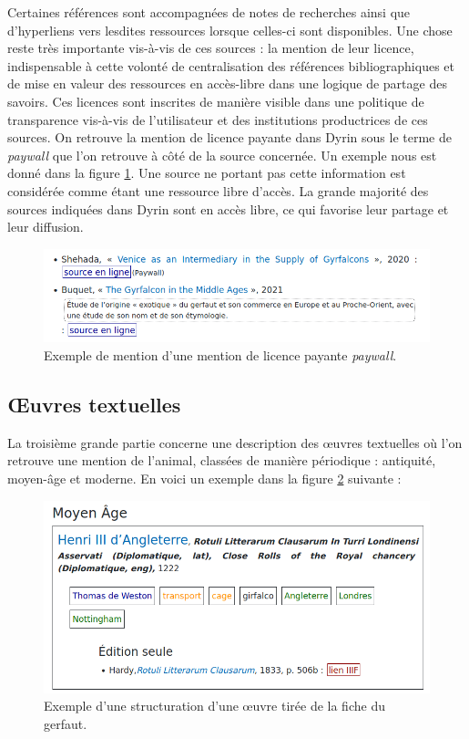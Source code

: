 \documentclass[a4paper,12pt,twoside]{book}
\begin{document}
Certaines références sont accompagnées de notes de recherches ainsi que d'hyperliens vers lesdites ressources lorsque celles-ci sont disponibles. Une chose reste très importante vis-à-vis de ces sources : la mention de leur licence, indispensable à cette volonté de centralisation des références bibliographiques et de mise en valeur des ressources en accès-libre dans une logique de partage des savoirs. Ces licences sont inscrites de manière visible dans une politique de transparence vis-à-vis de l'utilisateur et des institutions productrices de ces sources. On retrouve la mention de licence payante dans Dyrin sous le terme de \textit{paywall} que l'on retrouve à côté de la source concernée. Un exemple nous est donné dans la figure \ref{biblio_notes}. Une source ne portant pas cette information est considérée comme étant une ressource libre d'accès. La grande majorité des sources indiquées dans Dyrin sont en accès libre, ce qui favorise leur partage et leur diffusion.

\begin{figure}[H]
    \centering
    \includegraphics[width=12cm]{img/partie_3/biblio_notes.png}
    \caption{Exemple de mention d'une mention de licence payante \textit{paywall}.}
    \label{biblio_notes}
\end{figure}

\subsection{\OE{}uvres textuelles}
La troisième grande partie concerne une description des \oe{}uvres textuelles où l'on retrouve une mention de l'animal, classées de manière périodique : antiquité, moyen-âge et moderne. En voici un exemple dans la figure \ref{sources} suivante :

\begin{figure}[H]
    \centering
    \includegraphics[width=12cm]{img/partie_3/oeuvre.png}
    \caption{Exemple d'une structuration d'une \oe{}uvre tirée de la fiche du gerfaut.}
    \label{sources}
\end{figure}
\end{document}
